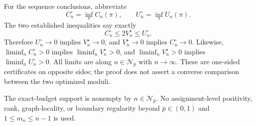 For the sequence conclusions, abbreviate
\[
 C_n^\circ=\inf_\pi C_n(\pi),
 \qquad
 U_n^\circ=\inf_\pi U_n(\pi).
\]
The two established inequalities say exactly
\[
 C_n^\circ\le2V_n^\star\le U_n^\circ.
\]
Therefore \(U_n^\circ\to0\) implies \(V_n^\star\to0\), and \(V_n^\star\to0\) implies \(C_n^\circ\to0\).  Likewise, \(\liminf_n C_n^\circ>0\) implies \(\liminf_nV_n^\star>0\), and \(\liminf_nV_n^\star>0\) implies \(\liminf_nU_n^\circ>0\).  All limits are along \(n\in\mathcal N_{\bar p}\) with \(n\to\infty\).  These are one-sided certificates on opposite sides; the proof does not assert a converse comparison between the two optimized moduli.

The exact-budget support is nonempty by \(n\in\mathcal N_{\bar p}\).  No assignment-level positivity, rank, graph-locality, or boundary regularity beyond \(\bar p\in(0,1)\) and \(1\le m_n\le n-1\) is used.